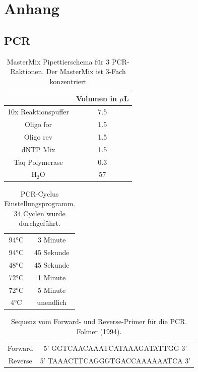 \documentclass[oneside,10pt,a4paper]{report}
\begin{document}
	
	\chapter{Anhang}
		\section{PCR}
		\begin{table}[H]
			\centering
			\caption{MasterMix Pipettierschema für 3 PCR-Raktionen. Der MasterMix ist 3-Fach konzentriert}
			\label{tab: Mastermix-Pipettierschema}
			\begin{tabular}{cc}
				\toprule
				& Volumen in $\mu$L\\
				\midrule
				10x Reaktionspuffer & 7.5 \\
				Oligo for & 1.5\\
				Oligo rev & 1.5\\
				dNTP Mix & 1.5\\
				Taq Polymerase & 0.3\\
				H$_2$O & 57\\
				\bottomrule
			\end{tabular}
		\end{table}
		
		
		\begin{table}[H]
			\centering
			\caption{PCR-Cyclus Einstellungsprogramm. 34 Cyclen wurde durchgeführt.}
			\label{tab: PCR-Cyclen}
			\begin{tabular}{cc}
				\toprule
				94°C & 3 Minute\\
				94°C & 45 Sekunde\\
				48°C & 45 Sekunde\\
				72°C & 1 Minute\\
				72°C & 5 Minute\\
				4°C & unendlich\\
				\bottomrule
			\end{tabular}
		\end{table}
		
		\begin{table}[H]
			\centering
			\caption{Sequenz vom Forward- und Reverse-Primer für die PCR. Folmer (1994).}
			\label{tab: Primer}
			\begin{tabular}{cc}
				Forward & 5’ GGTCAACAAATCATAAAGATATTGG 3'\\
				Reverse & 5’ TAAACTTCAGGGTGACCAAAAAATCA 3’\\				
			\end{tabular}
		\end{table}
		
\end{document}
